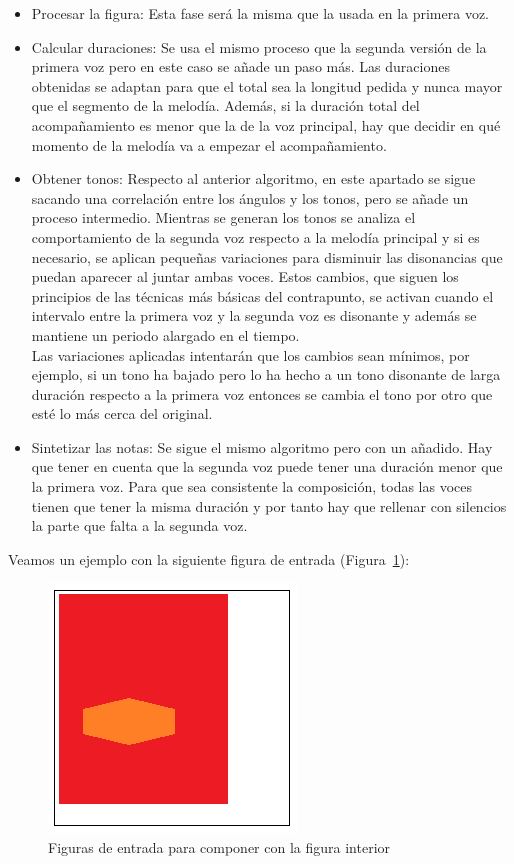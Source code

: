 \begin{itemize}
	\item Procesar la figura: Esta fase será la misma que la usada en la primera voz.

	\item Calcular duraciones: Se usa el mismo proceso que la segunda versión de la primera voz pero en este caso se añade un paso más. Las duraciones obtenidas se adaptan para que el total sea la longitud pedida y nunca mayor que el segmento de la melodía. Además, si la duración total del acompañamiento es menor que la de la voz principal, hay que decidir en qué momento de la melodía va a empezar el acompañamiento.

	\item Obtener tonos: Respecto al anterior algoritmo, en este apartado se sigue sacando una correlación entre los ángulos y los tonos, pero se añade un proceso intermedio. Mientras se generan los tonos se analiza el comportamiento de la segunda voz respecto a la melodía principal y si es necesario, se aplican pequeñas variaciones para disminuir las disonancias que puedan aparecer al juntar ambas voces. Estos cambios, que siguen los principios de las técnicas más básicas del contrapunto, se activan cuando el intervalo entre la primera voz y la segunda voz es disonante y además se mantiene un periodo alargado en el tiempo. \\
Las variaciones aplicadas intentarán que los cambios sean mínimos, por ejemplo, si un tono ha bajado pero lo ha hecho a un tono disonante de larga duración respecto a la primera voz entonces se cambia el tono por otro que esté lo más cerca del original.

	\item Sintetizar las notas: Se sigue el mismo algoritmo pero con un añadido. Hay que tener en cuenta que la segunda voz puede tener una duración menor que la primera voz. Para que sea consistente la composición, todas las voces tienen que tener la misma duración y por tanto hay que rellenar con silencios la parte que falta a la segunda voz.

\end{itemize}

Veamos un ejemplo con la siguiente figura de entrada (Figura~\ref{fig:Figura0Voz2}):

		\begin{figure}[htbp]
		\centering
		\hspace*{0.0in}
		\includegraphics[scale=1]{graphics/simpletest4.png}
		\caption{Figuras de entrada para componer con la figura interior}
		\label{fig:Figura0Voz2}
		\end{figure}

